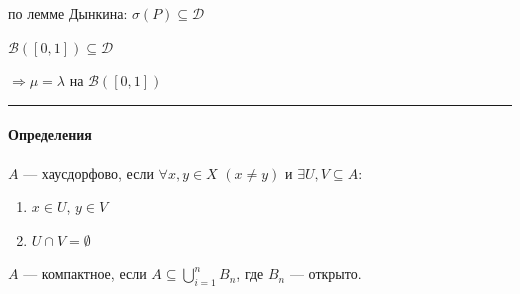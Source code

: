 \documentclass[11pt, a4paper]{article}
\begin{document}
по лемме Дынкина: $\sigma(P) \subseteq \mathcal{D}$

$\mathcal{B}([0,1]) \subseteq \mathcal{D}$

$\Rightarrow \mu = \lambda$ на $\mathcal{B}([0,1])$

\vspace{1.5em}
\hrule
\vspace{1.5em}

\paragraph{Определения}

$A$ --- хаусдорфово, если $\forall x, y \in X$ $(x \neq y)$ и $\exists U, V \subseteq A$:
\begin{enumerate}
    \item $x \in U$, $y \in V$
    \item $U \cap V = \emptyset$
\end{enumerate}

$A$ --- компактное, если $A \subseteq \bigcup\limits_{i=1}^n B_n$, где $B_n$ --- открыто.
\end{document}
